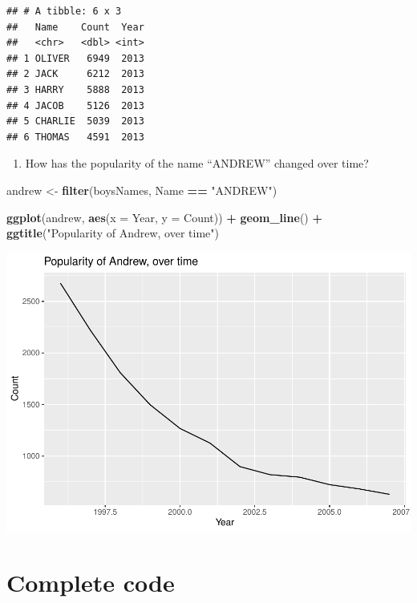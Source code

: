 \documentclass[
]{book}
\newenvironment{Shaded}{\begin{snugshade}}{\end{snugshade}}
\newcommand{\DataTypeTok}[1]{\textcolor[rgb]{0.13,0.29,0.53}{#1}}
\newcommand{\KeywordTok}[1]{\textcolor[rgb]{0.13,0.29,0.53}{\textbf{#1}}}
\newcommand{\NormalTok}[1]{#1}
\newcommand{\OperatorTok}[1]{\textcolor[rgb]{0.81,0.36,0.00}{\textbf{#1}}}
\newcommand{\StringTok}[1]{\textcolor[rgb]{0.31,0.60,0.02}{#1}}
\providecommand{\tightlist}{%
  \setlength{\itemsep}{0pt}\setlength{\parskip}{0pt}}
\begin{document}
\begin{alert}
\begin{verbatim}
## # A tibble: 6 x 3
##   Name    Count  Year
##   <chr>   <dbl> <int>
## 1 OLIVER   6949  2013
## 2 JACK     6212  2013
## 3 HARRY    5888  2013
## 4 JACOB    5126  2013
## 5 CHARLIE  5039  2013
## 6 THOMAS   4591  2013
\end{verbatim}

\begin{enumerate}
\def\labelenumi{\arabic{enumi}.}
\setcounter{enumi}{3}
\tightlist
\item
  How has the popularity of the name ``ANDREW'' changed over time?
\end{enumerate}

\begin{Shaded}
\begin{Highlighting}[]
\NormalTok{andrew \textless{}{-}}\StringTok{ }\KeywordTok{filter}\NormalTok{(boysNames, Name }\OperatorTok{==}\StringTok{ "ANDREW"}\NormalTok{)}

\KeywordTok{ggplot}\NormalTok{(andrew, }\KeywordTok{aes}\NormalTok{(}\DataTypeTok{x =}\NormalTok{ Year, }\DataTypeTok{y =}\NormalTok{ Count)) }\OperatorTok{+}
\StringTok{    }\KeywordTok{geom\_line}\NormalTok{() }\OperatorTok{+}
\StringTok{    }\KeywordTok{ggtitle}\NormalTok{(}\StringTok{"Popularity of Andrew, over time"}\NormalTok{)}
\end{Highlighting}
\end{Shaded}

\includegraphics{R/RDataWrangling/figures/unnamed-chunk-286-1.pdf}

\end{alert}

\hypertarget{complete-code}{%
\section{Complete code}\label{complete-code}}
\end{document}
